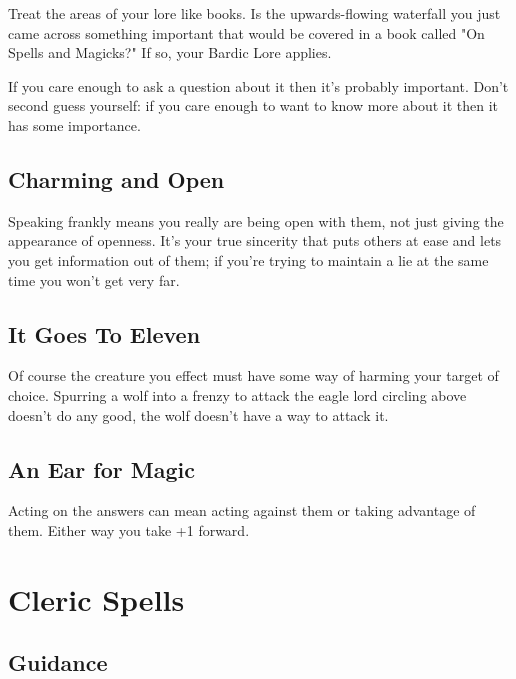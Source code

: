 Treat the areas of your lore like books. Is the upwards-flowing waterfall you just came across something important that would be covered in a book called "On Spells and Magicks?" If so, your Bardic Lore applies.

       

If you care enough to ask a question about it then it's probably important. Don't second guess yourself: if you care enough to want to know more about it then it has some importance.

       
\subsection{Charming and Open}   
       

Speaking frankly means you really are being open with them, not just giving the appearance of openness. It's your true sincerity that puts others at ease and lets you get information out of them; if you're trying to maintain a lie at the same time you won't get very far.

       
\subsection{It Goes To Eleven}   
       

Of course the creature you effect must have some way of harming your target of choice. Spurring a wolf into a frenzy to attack the eagle lord circling above doesn't do any good, the wolf doesn't have a way to attack it.

       
\subsection{An Ear for Magic}    
       

Acting on the answers can mean acting against them or taking advantage of them. Either way you take +1 forward.

       
\section{Cleric Spells}    
       
\subsection{Guidance}   
       

